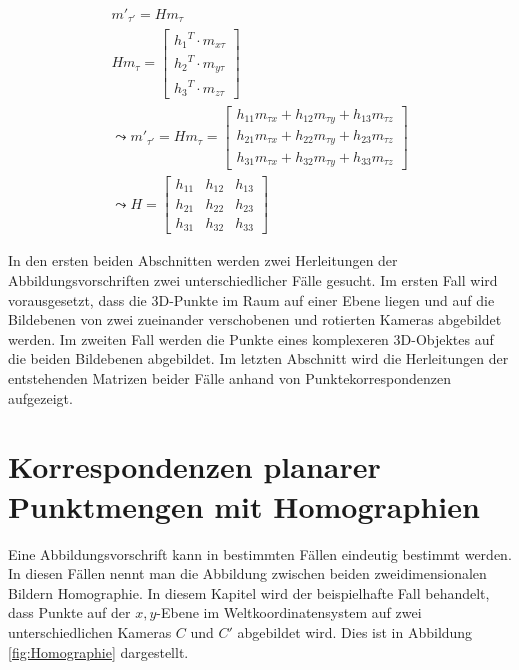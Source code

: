 \begin{gather}
	m'_{\tau'} = Hm_{\tau}\\
	Hm_{\tau} = \begin{bmatrix}
		{h_1}^T \cdot m_{x \tau}\\{h_2}^T \cdot m_{y \tau}\\{h_3}^T \cdot m_{z \tau}
	\end{bmatrix} \\
	\leadsto 
	m'_{\tau'}= Hm_{\tau}= \begin{bmatrix}
		h_{11}m_{\tau x}+h_{12}m_{\tau y}+h_{13}m_{\tau z}\\
		h_{21}m_{\tau x}+h_{22}m_{\tau y}+h_{23}m_{\tau z}\\
		h_{31}m_{\tau x}+h_{32}m_{\tau y}+h_{33}m_{\tau z}
	\end{bmatrix}\\
	\leadsto 
	H=\begin{bmatrix}
		h_{11}&h_{12}&h_{13}\\
		h_{21}&h_{22}&h_{23}\\
		h_{31}&h_{32}&h_{33}
	\end{bmatrix}
\end{gather}


In den ersten beiden Abschnitten werden zwei Herleitungen der Abbildungsvorschriften zwei unterschiedlicher Fälle gesucht. Im ersten Fall wird vorausgesetzt, dass die 3D-Punkte im Raum auf einer Ebene liegen und auf die Bildebenen von zwei zueinander verschobenen und rotierten Kameras abgebildet werden. Im zweiten Fall werden die Punkte eines komplexeren 3D-Objektes auf die beiden Bildebenen abgebildet. Im letzten Abschnitt wird die Herleitungen der entstehenden Matrizen beider Fälle anhand von Punktekorrespondenzen aufgezeigt. 


\section{Korrespondenzen planarer Punktmengen mit Homographien}

Eine Abbildungsvorschrift kann in bestimmten Fällen eindeutig bestimmt werden. In diesen Fällen nennt man die Abbildung zwischen beiden zweidimensionalen Bildern Homographie\cite{HZ,Elements,Roser}. In diesem Kapitel wird der beispielhafte Fall behandelt, dass Punkte auf der $x,y$-Ebene im Weltkoordinatensystem auf zwei unterschiedlichen Kameras $C$ und $C'$ abgebildet wird. Dies ist in Abbildung \ref{fig:Homographie} dargestellt.

